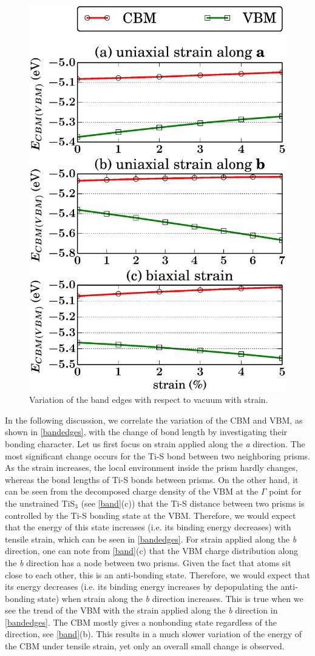 \begin{figure}[htb]
\centering
\includegraphics[width=0.6\linewidth]{Mob_bandedges.eps}
\caption{Variation of the band edges with respect to vacuum with strain. \label{bandedges}}
\end{figure}

In the following discussion, we correlate the variation of the CBM and VBM, as shown in \autoref{bandedges}, with the change of bond length by investigating their bonding character. Let us first focus on strain applied along the \textit{a} direction. The most significant change occurs for the Ti-S bond between two neighboring prisms. As the strain increases, the local environment inside the prism hardly changes, whereas the bond lengths of Ti-S bonds between prisms. On the other hand, it can be seen from the decomposed charge density of the VBM at the $\Gamma$ point for the unstrained TiS$_3$ (see \autoref{band}(c)) that the Ti-S distance between two prisms is controlled by the Ti-S bonding state at the VBM. Therefore, we would expect that the energy of this state increases (i.e. its binding energy decreases) with tensile strain, which can be seen in \autoref{bandedges}. For strain applied along the \textit{b} direction, one can note from \autoref{band}(c) that the VBM charge distribution along the \textit{b} direction has a node between two prisms. Given the fact that atoms sit close to each other, this is an  anti-bonding state. Therefore, we would expect that its energy decreases (i.e. its binding energy increases by depopulating the anti-bonding state) when strain along the \textit{b} direction increases. This is true when we see the trend of the VBM with the strain applied along the \textit{b} direction in \autoref{bandedges}. The CBM mostly gives a nonbonding state regardless of the direction, see \autoref{band}(b). This results in a much slower variation of the energy of  the CBM under tensile strain, yet only an overall small change is observed. 

